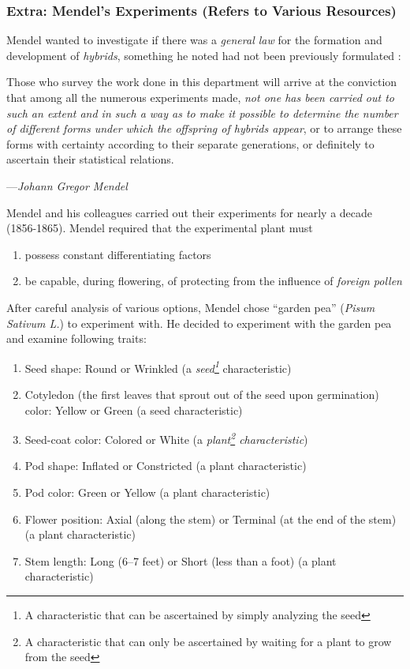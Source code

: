 \documentclass[12pt]{article}
\begin{document}
\subsubsection{Extra: Mendel's Experiments (Refers to Various Resources)}
Mendel wanted to investigate if there was a \emph{general law} for the formation and development of \emph{hybrids}, something he noted had not been previously formulated \cite{mendel-fisher}: 
\epigraph{
    Those who survey the work done in this department will arrive at the conviction that among all the numerous experiments made, \emph{not one has been carried out to such an extent and in such a way as to make it possible to determine the number of different forms under which the offspring of hybrids appear}, or to arrange these forms with certainty according to their separate generations, or definitely to ascertain their statistical relations.
}
{
    ---\textit{Johann Gregor Mendel \cite{mendel-fisher}}
}

Mendel and his colleagues carried out their experiments for nearly a decade (1856-1865). Mendel required \cite{mendel-fisher} that the experimental plant must
\begin{enumerate}
    \item possess constant differentiating factors
    \item be capable, during flowering, of protecting from the influence of \emph{foreign pollen}
\end{enumerate}

After careful analysis of various options, Mendel chose ``garden pea'' (\emph{Pisum Sativum L.}) to experiment with. He decided to experiment with the garden pea and examine following traits:
\begin{enumerate}
    \item Seed shape: Round or Wrinkled (a \emph{seed\footnote{A characteristic that can be ascertained by simply analyzing the seed}} characteristic)
    \item Cotyledon (the first leaves that sprout out of the seed upon germination) color: Yellow or Green (a seed characteristic)
    \item Seed-coat color: Colored or White (a \emph{plant\footnote{A characteristic that can only be ascertained by waiting for a plant to grow from the seed} characteristic})
    \item Pod shape: Inflated or Constricted (a plant characteristic)
    \item Pod color: Green or Yellow (a plant characteristic)
    \item Flower position: Axial (along the stem) or Terminal (at the end of the stem) (a plant characteristic)
    \item Stem length: Long (6--7 feet) or Short (less than a foot) (a plant characteristic)
\end{enumerate}
\end{document}
